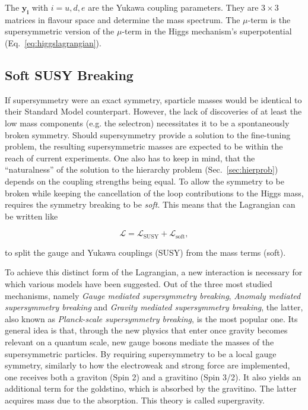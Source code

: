 \noindent The $\mathbf{y_i}$ with $i = u,d,e$ are the Yukawa coupling parameters. They are $3 \times 3$ matrices in flavour space and determine the mass spectrum. The $\mu$-term is the supersymmetric version of the $\mu$-term in the Higgs mechanism's superpotential (Eq.~\ref{eq:higgslagrangian}).

\subsection{Soft SUSY Breaking}

If supersymmetry were an exact symmetry, sparticle masses would be identical to their Standard Model counterpart. However, the lack of discoveries of at least the low mass components (e.g. the selectron) necessitates it to be a spontaneously broken symmetry. Should supersymmetry provide a solution to the fine-tuning problem, the resulting supersymmetric masses are expected to be within the reach of current experiments. One also has to keep in mind, that the ``naturalness'' of the solution to the hierarchy problem (Sec.~\ref{sec:hierprob}) depends on the coupling strengths being equal. To allow the symmetry to be broken while keeping the cancellation of the loop contributions to the Higgs mass, requires the symmetry breaking to be \textit{soft}. This means that the Lagrangian can be written like

\begin{equation}
  \label{eq:softlagr}
  \mathcal{L} = \mathcal{L}_{\text{SUSY}} + \mathcal{L}_{\text{soft}},
\end{equation}

\noindent to split the gauge and Yukawa couplings (SUSY) from the mass terms (soft).


To achieve this distinct form of the Lagrangian, a new interaction is necessary for which various models have been suggested. Out of the three most studied mechanisms, namely \textit{Gauge mediated supersymmetry breaking}, \textit{Anomaly mediated supersymmetry breaking} and \textit{Gravity mediated supersymmetry breaking}, the latter, also known as \textit{Planck-scale supersymmetry breaking}, is the most popular one. Its general idea is that, through the new physics that enter once gravity becomes relevant on a quantum scale, new gauge bosons mediate the masses of the supersymmetric particles. By requiring supersymmetry to be a local gauge symmetry, similarly to how the electroweak and strong force are implemented, one receives both a graviton (Spin 2) and a gravitino (Spin 3/2). It also yields an additional term for the goldstino, which is absorbed by the gravitino. The latter acquires mass due to the absorption. This theory is called supergravity.

